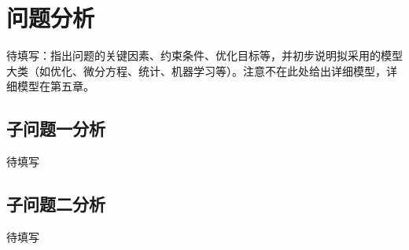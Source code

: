 \section{问题分析}\label{sec:analysis}

待填写：指出问题的关键因素、约束条件、优化目标等，并初步说明拟采用的模型大类（如优化、微分方程、统计、机器学习等）。注意不在此处给出详细模型，详细模型在第五章。

\subsection{子问题一分析}
待填写

\subsection{子问题二分析}
待填写

